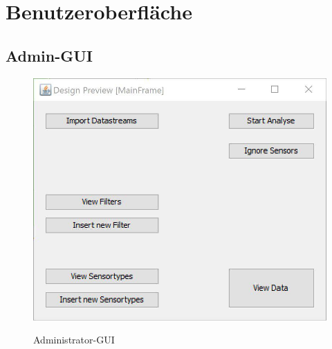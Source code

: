 \chapter{Benutzeroberfläche}
\section{Admin-GUI}
\begin{figure}[H]
	\centering
		\includegraphics[width=0.6\linewidth]{gui/backend/BackGUISketch.jpg}\\
	\caption{Administrator-GUI}
\end{figure}
\newpage
